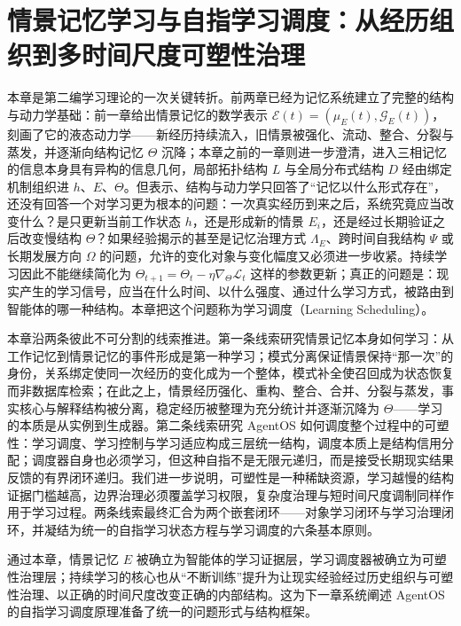 \chapter{情景记忆学习与自指学习调度：从经历组织到多时间尺度可塑性治理}

\begin{chapterlead}
本章是第二编学习理论的一次关键转折。前两章已经为记忆系统建立了完整的结构与动力学基础：前一章给出情景记忆的数学表示 \(\mathcal{E}(t)=(\mu_E(t),\mathcal{G}_E(t))\)，刻画了它的液态动力学——新经历持续流入，旧情景被强化、流动、整合、分裂与蒸发，并逐渐向结构记忆 \(\Theta\) 沉降；本章之前的一章则进一步澄清，进入三相记忆的信息本身具有异构的信息几何，局部拓扑结构 \(L\) 与全局分布式结构 \(D\) 经由绑定机制组织进 \(h\)、\(E\)、\(\Theta\)。但表示、结构与动力学只回答了“记忆以什么形式存在”，还没有回答一个对学习更为根本的问题：一次真实经历到来之后，系统究竟应当改变什么？是只更新当前工作状态 \(h\)，还是形成新的情景 \(E_i\)，还是经过长期验证之后改变慢结构 \(\Theta\)？如果经验揭示的甚至是记忆治理方式 \(\Lambda_E\)、跨时间自我结构 \(\Psi\) 或长期发展方向 \(\Omega\) 的问题，允许的变化对象与变化幅度又必须进一步收紧。持续学习因此不能继续简化为 \(\Theta_{t+1}=\Theta_t-\eta\nabla_{\Theta}\mathcal L_t\) 这样的参数更新；真正的问题是：现实产生的学习信号，应当在什么时间、以什么强度、通过什么学习方式，被路由到智能体的哪一种结构。本章把这个问题称为学习调度（Learning Scheduling）。

本章沿两条彼此不可分割的线索推进。第一条线索研究情景记忆本身如何学习：从工作记忆到情景记忆的事件形成是第一种学习；模式分离保证情景保持“那一次”的身份，关系绑定使同一次经历的变化成为一个整体，模式补全使召回成为状态恢复而非数据库检索；在此之上，情景经历强化、重构、整合、合并、分裂与蒸发，事实核心与解释结构被分离，稳定经历被整理为充分统计并逐渐沉降为 \(\Theta\)——学习的本质是从实例到生成器。第二条线索研究 AgentOS 如何调度整个过程中的可塑性：学习调度、学习控制与学习适应构成三层统一结构，调度本质上是结构信用分配；调度器自身也必须学习，但这种自指不是无限元递归，而是接受长期现实结果反馈的有界闭环递归。我们进一步说明，可塑性是一种稀缺资源，学习越慢的结构证据门槛越高，边界治理必须覆盖学习权限，复杂度治理与短时间尺度调制同样作用于学习过程。两条线索最终汇合为两个嵌套闭环——对象学习闭环与学习治理闭环，并凝结为统一的自指学习状态方程与学习调度的六条基本原则。

通过本章，情景记忆 \(E\) 被确立为智能体的学习证据层，学习调度器被确立为可塑性治理层；持续学习的核心也从“不断训练”提升为让现实经验经过历史组织与可塑性治理、以正确的时间尺度改变正确的内部结构。这为下一章系统阐述 AgentOS 的自指学习调度原理准备了统一的问题形式与结构框架。
\end{chapterlead}

